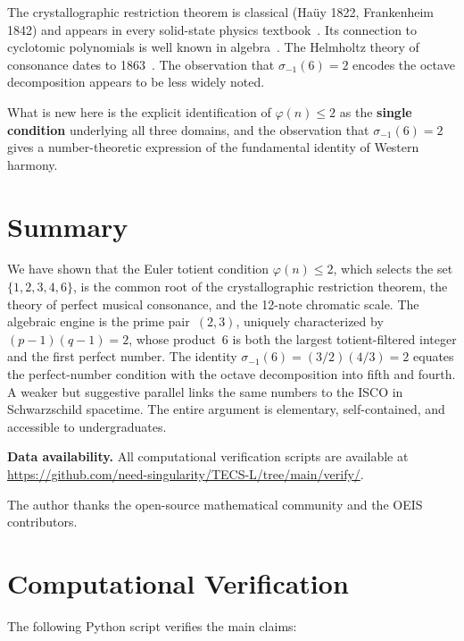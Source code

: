 \documentclass[preprint]{revtex4-2}
\begin{document}
The crystallographic restriction theorem is classical (Ha\"uy 1822, Frankenheim 1842) and appears in every solid-state physics textbook~\cite{ashcroft,kittel}. Its connection to cyclotomic polynomials is well known in algebra~\cite{lang}. The Helmholtz theory of consonance dates to 1863~\cite{helmholtz}. The observation that $\sigma_{-1}(6) = 2$ encodes the octave decomposition appears to be less widely noted.

What is new here is the explicit identification of $\varphi(n) \leq 2$ as the \textbf{single condition} underlying all three domains, and the observation that $\sigma_{-1}(6) = 2$ gives a number-theoretic expression of the fundamental identity of Western harmony.

\section{Summary}

We have shown that the Euler totient condition $\varphi(n) \leq 2$, which selects the set $\{1, 2, 3, 4, 6\}$, is the common root of the crystallographic restriction theorem, the theory of perfect musical consonance, and the 12-note chromatic scale. The algebraic engine is the prime pair~$(2,3)$, uniquely characterized by $(p-1)(q-1) = 2$, whose product~6 is both the largest totient-filtered integer and the first perfect number. The identity $\sigma_{-1}(6) = (3/2)(4/3) = 2$ equates the perfect-number condition with the octave decomposition into fifth and fourth. A weaker but suggestive parallel links the same numbers to the ISCO in Schwarzschild spacetime. The entire argument is elementary, self-contained, and accessible to undergraduates.

\bigskip
\noindent\textbf{Data availability.} All computational verification scripts are available at \url{https://github.com/need-singularity/TECS-L/tree/main/verify/}.

\begin{acknowledgments}
The author thanks the open-source mathematical community and the OEIS contributors.
\end{acknowledgments}

\appendix

\section{Computational Verification}\label{app:code}

The following Python script verifies the main claims:
\end{document}
